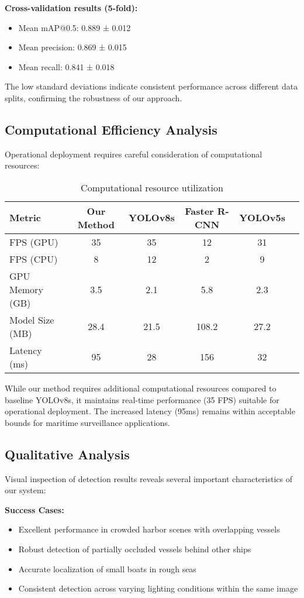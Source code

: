 \documentclass[10pt]{article}
\begin{document}
\textbf{Cross-validation results (5-fold):}
\begin{itemize}
\item Mean mAP@0.5: 0.889 ± 0.012
\item Mean precision: 0.869 ± 0.015
\item Mean recall: 0.841 ± 0.018
\end{itemize}

The low standard deviations indicate consistent performance across different data splits, confirming the robustness of our approach.

\subsection{Computational Efficiency Analysis}

Operational deployment requires careful consideration of computational resources:

\begin{table}[ht]
\centering
\caption{Computational resource utilization}
\label{tab:computational}
\begin{tabular}{lccccc}
\toprule
Metric & Our Method & YOLOv8s & Faster R-CNN & YOLOv5s \\
\midrule
FPS (GPU) & 35 & 35 & 12 & 31 \\
FPS (CPU) & 8 & 12 & 2 & 9 \\
GPU Memory (GB) & 3.5 & 2.1 & 5.8 & 2.3 \\
Model Size (MB) & 28.4 & 21.5 & 108.2 & 27.2 \\
Latency (ms) & 95 & 28 & 156 & 32 \\
\bottomrule
\end{tabular}
\end{table}

While our method requires additional computational resources compared to baseline YOLOv8s, it maintains real-time performance (35 FPS) suitable for operational deployment. The increased latency (95ms) remains within acceptable bounds for maritime surveillance applications.

\subsection{Qualitative Analysis}

Visual inspection of detection results reveals several important characteristics of our system:

\textbf{Success Cases:}
\begin{itemize}
\item Excellent performance in crowded harbor scenes with overlapping vessels
\item Robust detection of partially occluded vessels behind other ships
\item Accurate localization of small boats in rough seas
\item Consistent detection across varying lighting conditions within the same image
\end{itemize}
\end{document}
